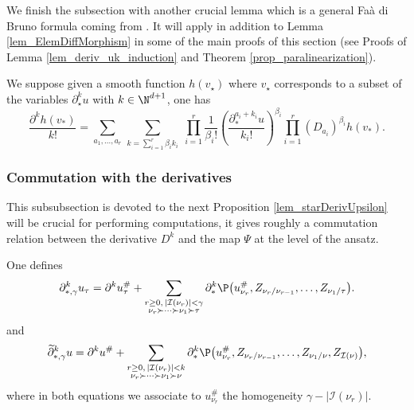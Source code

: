 \documentclass[11pt]{preprint}
\newcommand{\mcI}{\mathcal{I}}
\begin{document}
	We finish the subsection with another crucial lemma which is a general Fa\`a di Bruno formula coming from \cite[Lemma A.1]{BCCH}. It will apply in addition to Lemma \ref{lem_ElemDiffMorphism} in some of the main proofs of this section (see Proofs of Lemma \ref{lem_deriv_uk_induction} and Theorem \ref{prop_paralinearization}). 
	\begin{lemma} \label{Faa Di Bruno}
		We suppose given a smooth function $h(v_{\star})$ where $v_{\star} $ corresponds to a subset of the variables  $  \partial_{\star}^{k} u $ with $k \in \N^{d+1}$, one has
		$$
		\frac{\partial^{k}h(v_*)}{k!} =  \sum_{a_1,...,a_r} \, \sum_{k = \sum_{i=1}^r \beta_i k_i} \; \prod_{i=1}^r \frac{1}{\beta_i !} \left(\frac{\partial_{*}^{a_i +k_i} u}{k_i!}\right)^{\beta_i} \prod_{i=1}^r (D_{a_i})^{\beta_i} h(v_*).
		$$
		\end{lemma}
		
	

	\subsubsection{Commutation with the derivatives}
	
	This subsubsection is devoted to the next Proposition \ref{lem_starDerivUpsilon} will be crucial for performing computations, it gives roughly a commutation relation between the derivative $D^k$ and the map $\Psi$ at the level of the ansatz. 
	
	One defines
	$$
	\partial^k_{*,\gamma}u_\tau = \partial^k u_\tau^\# + \sum_{\substack{r\geq 0, \, |\mcI(\nu_r)|<\gamma \\ \nu_r\succ\dots\succ\nu_1\succ\tau}}\partial^k_*\P\big(u_{\nu_r}^\#, Z_{\nu_r/\nu_{r-1}},\dots, Z_{\nu_1/\tau}\big).
	$$
	and 
	$$
	\widetilde{\partial}^k_{*,\gamma} u  = \partial^k u^{\#} + \sum_{\substack{r\geq 0, \, |\mcI(\nu_r)|<k \\ \nu_r\succ\dots\succ\nu_1\succ\nu}}\partial^k_*\P\big(u_{\nu_r}^\#, Z_{\nu_r/\nu_{r-1}},\dots,Z_{\nu_1/\nu}, Z_{\mcI(\nu)}\big),
	$$
	where in both equations we associate to $u_{\nu_r}^\#$ the homogeneity $\gamma-|\mcI(\nu_r)|$.
	
\end{document}
